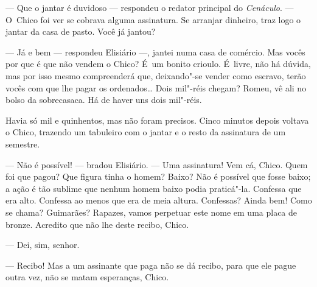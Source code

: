 \begin{linenumbers}
--- Que o jantar é duvidoso --- respondeu o redator principal do
\emph{Cenáculo}. --- O~Chico foi ver se cobrava alguma assinatura. Se
arranjar dinheiro, traz logo o jantar da casa de pasto. Você já jantou?

--- Já e bem --- respondeu Elisiário ---, jantei numa casa de comércio. Mas
vocês por que é que não vendem o Chico? É~um bonito crioulo. É~livre,
não há dúvida, mas por isso mesmo compreenderá que, deixando"-se vender
como escravo, terão vocês com que lhe pagar os ordenados\ldots{} Dois
mil"-réis chegam? Romeu, vê ali no bolso da sobrecasaca. Há de haver uns
dois mil"-réis.

Havia só mil e quinhentos, mas não foram precisos. Cinco minutos depois
voltava o Chico, trazendo um tabuleiro com o jantar e o resto da
assinatura de um semestre.

--- Não é possível! --- bradou Elisiário. --- Uma assinatura! Vem cá,
Chico. Quem foi que pagou? Que figura tinha o homem? Baixo? Não é
possível que fosse baixo; a ação é tão sublime que nenhum homem baixo
podia praticá"-la. Confessa que era alto. Confessa ao menos que era de
meia altura. Confessas? Ainda bem! Como se chama? Guimarães? Rapazes,
vamos perpetuar este nome em uma placa de bronze. Acredito que não lhe
deste recibo, Chico.

--- Dei, sim, senhor.

--- Recibo! Mas a um assinante que paga não se dá recibo, para que ele
pague outra vez, não se matam esperanças, Chico.


\end{linenumbers}

